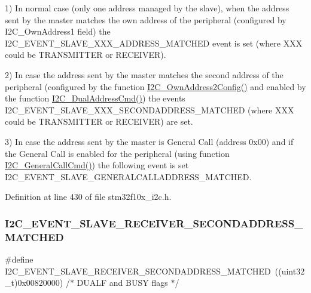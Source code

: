 1) In normal case (only one address managed by the slave), when the address sent by the master matches the own address of the peripheral (configured by I2\+C\+\_\+\+Own\+Address1 field) the I2\+C\+\_\+\+E\+V\+E\+N\+T\+\_\+\+S\+L\+A\+V\+E\+\_\+\+X\+X\+X\+\_\+\+A\+D\+D\+R\+E\+S\+S\+\_\+\+M\+A\+T\+C\+H\+ED event is set (where X\+XX could be T\+R\+A\+N\+S\+M\+I\+T\+T\+ER or R\+E\+C\+E\+I\+V\+ER).

2) In case the address sent by the master matches the second address of the peripheral (configured by the function \hyperlink{group___i2_c___exported___functions_ga7be2cc634a613c8e3539137e897a22df}{I2\+C\+\_\+\+Own\+Address2\+Config()} and enabled by the function \hyperlink{group___i2_c___exported___functions_ga02145a333a56e79557d6ef4ea03fc313}{I2\+C\+\_\+\+Dual\+Address\+Cmd()}) the events I2\+C\+\_\+\+E\+V\+E\+N\+T\+\_\+\+S\+L\+A\+V\+E\+\_\+\+X\+X\+X\+\_\+\+S\+E\+C\+O\+N\+D\+A\+D\+D\+R\+E\+S\+S\+\_\+\+M\+A\+T\+C\+H\+ED (where X\+XX could be T\+R\+A\+N\+S\+M\+I\+T\+T\+ER or R\+E\+C\+E\+I\+V\+ER) are set.

3) In case the address sent by the master is General Call (address 0x00) and if the General Call is enabled for the peripheral (using function \hyperlink{group___i2_c___exported___functions_ga65c740fc8d7b3b9f15cc432d8699d471}{I2\+C\+\_\+\+General\+Call\+Cmd()}) the following event is set I2\+C\+\_\+\+E\+V\+E\+N\+T\+\_\+\+S\+L\+A\+V\+E\+\_\+\+G\+E\+N\+E\+R\+A\+L\+C\+A\+L\+L\+A\+D\+D\+R\+E\+S\+S\+\_\+\+M\+A\+T\+C\+H\+ED. 

Definition at line 430 of file stm32f10x\+\_\+i2c.\+h.

\mbox{\label{group___i2_c___events_ga17e78ab01fa980b3df10f8d9f6864c48}} 
\subsubsection{\texorpdfstring{I2\+C\+\_\+\+E\+V\+E\+N\+T\+\_\+\+S\+L\+A\+V\+E\+\_\+\+R\+E\+C\+E\+I\+V\+E\+R\+\_\+\+S\+E\+C\+O\+N\+D\+A\+D\+D\+R\+E\+S\+S\+\_\+\+M\+A\+T\+C\+H\+ED}{I2C\_EVENT\_SLAVE\_RECEIVER\_SECONDADDRESS\_MATCHED}}
{\footnotesize\ttfamily \#define I2\+C\+\_\+\+E\+V\+E\+N\+T\+\_\+\+S\+L\+A\+V\+E\+\_\+\+R\+E\+C\+E\+I\+V\+E\+R\+\_\+\+S\+E\+C\+O\+N\+D\+A\+D\+D\+R\+E\+S\+S\+\_\+\+M\+A\+T\+C\+H\+ED~((uint32\+\_\+t)0x00820000)  /$\ast$ D\+U\+A\+L\+F and B\+U\+S\+Y flags $\ast$/}



